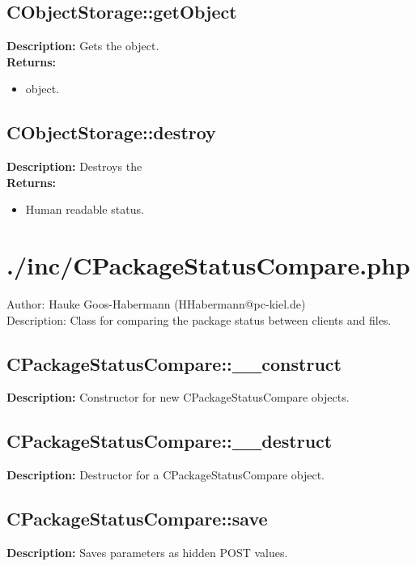 \subsection{CObjectStorage::getObject}
\textbf{Description:} Gets the object.\\
\textbf{Returns:}
\begin{itemize}
\item object.
\end{itemize}

\subsection{CObjectStorage::destroy}
\textbf{Description:} Destroys the \\
\textbf{Returns:}
\begin{itemize}
\item Human readable status.
\end{itemize}

\newpage\section{./inc/CPackageStatusCompare.php}
 Author: Hauke Goos-Habermann (HHabermann@pc-kiel.de)\\
 Description: Class for comparing the package status between clients and files.\\

\subsection{CPackageStatusCompare::\_\_construct}
\textbf{Description:} Constructor for new CPackageStatusCompare objects.\\

\subsection{CPackageStatusCompare::\_\_destruct}
\textbf{Description:} Destructor for a CPackageStatusCompare object.\\

\subsection{CPackageStatusCompare::save}
\textbf{Description:} Saves parameters as hidden POST values.\\

